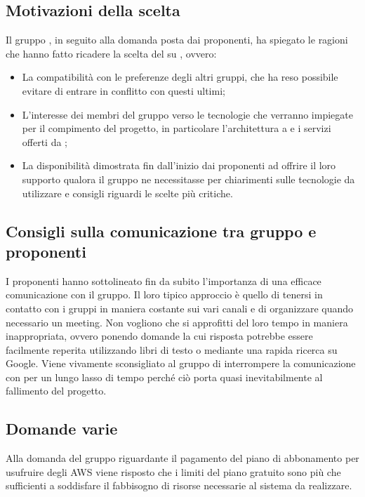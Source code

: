 \subsection{Motivazioni della scelta}
Il gruppo {\Gruppo}, in seguito alla domanda posta dai proponenti, ha spiegato le ragioni che hanno fatto ricadere la scelta del  su {\NomeProgetto}, ovvero:
\begin{itemize}
	\item La compatibilità con le preferenze degli altri gruppi, che ha reso possibile evitare di entrare in conflitto con questi ultimi;
	\item L'interesse dei membri del gruppo verso le tecnologie che verranno impiegate per il compimento del progetto, in particolare l'architettura a  e i servizi offerti da ;
	\item La disponibilità dimostrata fin dall'inizio dai proponenti ad offrire il loro supporto qualora il gruppo ne necessitasse per chiarimenti sulle tecnologie da utilizzare e consigli riguardi le scelte più critiche.
\end{itemize}
\subsection{Consigli sulla comunicazione tra gruppo e proponenti}
I proponenti hanno sottolineato fin da subito l'importanza di una efficace comunicazione con il gruppo. Il loro tipico approccio è quello di tenersi in contatto con i gruppi in maniera costante sui vari canali  e di organizzare quando necessario un meeting.
Non vogliono che si approfitti del loro tempo in maniera inappropriata, ovvero ponendo domande la cui risposta potrebbe essere facilmente reperita utilizzando libri di testo o mediante una rapida ricerca su Google.
Viene vivamente sconsigliato al gruppo di interrompere la comunicazione con \Proponente per un lungo lasso di tempo perché ciò porta quasi inevitabilmente al fallimento del progetto.
\subsection{Domande varie}
Alla domanda del gruppo riguardante il pagamento del piano di abbonamento per usufruire degli AWS viene risposto che i limiti del piano gratuito sono più che sufficienti a soddisfare il fabbisogno di risorse necessarie al sistema da realizzare.

